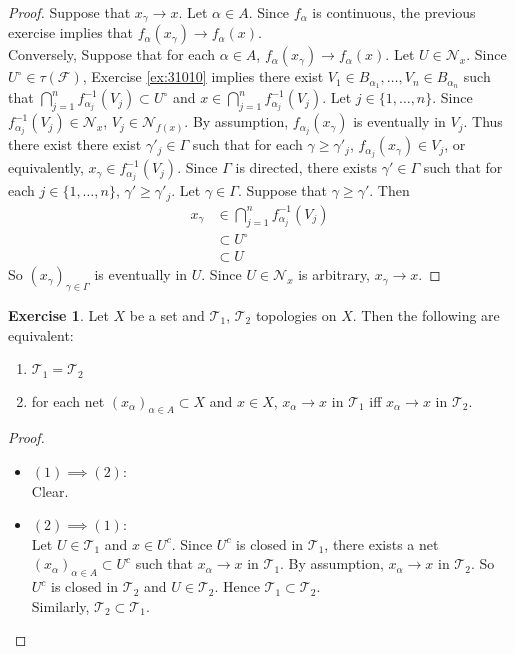 \documentclass[12pt]{amsart}
\theoremstyle{definition}
\newtheorem{ex}[definition]{Exercise}
\newcommand{\al}{\alpha}
\newcommand{\gam}{\gamma}
\newcommand{\Gam}{\Gamma}
\newcommand{\MF}{\mathcal{F}}
\newcommand{\MN}{\mathcal{N}}
\newcommand{\MT}{\mathcal{T}}
\newcommand{\lex}[1]{\label{ex:#1}}
\newcommand{\rex}[1]{Exercise \ref{ex:#1}}
\begin{document}
	\begin{proof}
	Suppose that $x_{\gam} \rightarrow x$. Let $\al \in A$. Since $f_{\al}$ is continuous, the previous exercise implies that $f_{\al}(x_{\gam}) \rightarrow f_{\al}(x)$. \\
	Conversely, Suppose that for each $\al \in A$,  $f_{\al}(x_{\gam}) \rightarrow f_{\al}(x)$. Let $U \in \MN_x$. Since $U^{\circ} \in \tau(\MF)$, \rex{31010} implies there exist $V_1 \in B_{\al_1}, \ldots, V_n \in B_{\al_n}$ such that $\bigcap\limits_{j=1}^n f_{\al_j}^{-1}(V_j) \subset U^{\circ}$ and $x \in \bigcap\limits_{j=1}^n f_{\al_j}^{-1}(V_j)$. Let $j \in \{1, \ldots, n\}$. Since $f_{\al_j}^{-1}(V_j) \in \MN_x$, $V_j \in \MN_{f(x)}$. By assumption, $f_{\al_j}(x_{\gam})$ is eventually in $V_j$. Thus there exist there exist $\gam'_j \in \Gam$ such that for each $\gam \geq \gam'_j$, $f_{\al_j}(x_{\gam}) \in V_j$, or equivalently, $x_{\gam} \in f_{\al_j}^{-1}(V_j)$. Since $\Gam$ is directed, there exists $\gam' \in \Gam$ such that for each $j \in \{1, \ldots, n\}$, $\gam' \geq \gam'_j$. Let $\gam \in \Gam$. Suppose that $\gam \geq \gam'$. Then 
	\begin{align*}
	x_{\gam} 
	& \in \bigcap\limits_{j=1}^n f_{\al_j}^{-1}(V_j) \\
	& \subset U^{\circ} \\
	& \subset U
\end{align*}	
	So $(x_\gam)_{\gam \in \Gam}$ is eventually in $U$. Since $U \in \MN_x$ is arbitrary, $x_{\gam} \rightarrow x$.  
	\end{proof}
	
	
	\begin{ex} \lex{33012}
	Let $X$ be a set and $\MT_1$, $\MT_2$ topologies on $X$. Then the following are equivalent:
	\begin{enumerate}
		\item $\MT_1 = \MT_2$
		\item for each net $(x_{\al})_{\al \in A} \subset X$ and $x \in X$, $x_{\al} \rightarrow x$ in $\MT_1$ iff $x_{\al} \rightarrow x$ in $\MT_2$.
	\end{enumerate}
	\end{ex}

	\begin{proof}\
		\begin{itemize}
			\item $(1) \implies (2)$: \\
			Clear. \\
			\item $(2) \implies (1)$: \\
			Let $U \in \MT_1$ and $x \in U^c$. Since $U^c$ is closed in $\MT_1$, there exists a net $(x_{\al})_{\al \in A} \subset U^c$ such that $x_{\al} \rightarrow x$ in $\MT_1$. By assumption, $x_{\al} \rightarrow x$ in $\MT_2$. So $U^c$ is closed in $\MT_2$ and $U \in \MT_2$. Hence $\MT_1 \subset \MT_2$. \\
			Similarly, $\MT_2 \subset \MT_1$.
		\end{itemize}
	\end{proof}
	
\end{document}
